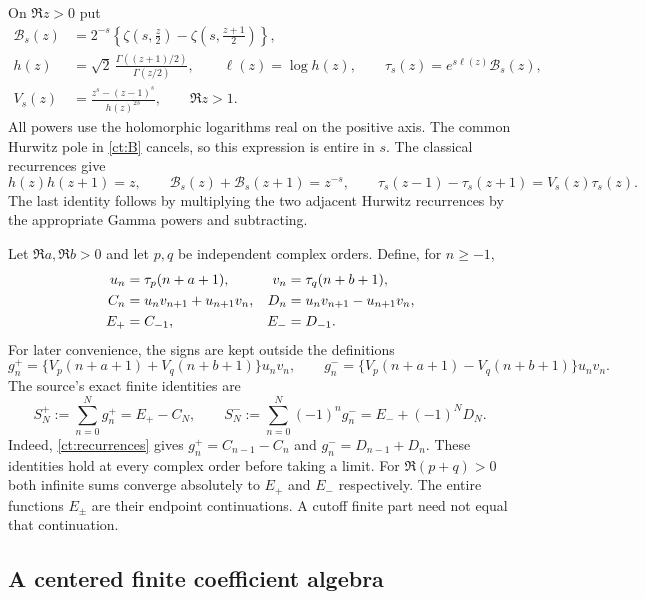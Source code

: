 \documentclass[11pt,letterpaper]{article}
\numberwithin{equation}{section}
\theoremstyle{definition}
\theoremstyle{remark}
\begin{document}
On $\Re z>0$ put
\begin{align}
 \mathcal B_s(z)&=2^{-s}\left\{\zeta\left(s,\frac z2\right)
              -\zeta\left(s,\frac{z+1}{2}\right)\right\},
                   \label{ct:B}\\
 h(z)&=\sqrt2\,\frac{\Gamma((z+1)/2)}{\Gamma(z/2)},
 \qquad \ell(z)=\log h(z),\qquad
 \tau_s(z)=e^{s\ell(z)}\mathcal B_s(z),\label{ct:tau}\\
 V_s(z)&=\frac{z^s-(z-1)^s}{h(z)^{2s}},\qquad \Re z>1.
                   \label{ct:V}
\end{align}
All powers use the holomorphic logarithms real on the positive axis.
The common Hurwitz pole in \eqref{ct:B} cancels, so this expression is
entire in $s$. The classical recurrences give
\begin{equation}\label{ct:recurrences}
 h(z)h(z+1)=z,\qquad
 \mathcal B_s(z)+\mathcal B_s(z+1)=z^{-s},\qquad
 \tau_s(z-1)-\tau_s(z+1)=V_s(z)\tau_s(z).
\end{equation}
The last identity follows by multiplying the two adjacent Hurwitz
recurrences by the appropriate Gamma powers and subtracting.

Let $\Re a,\Re b>0$ and let $p,q$ be independent complex orders. Define,
for $n\ge-1$,
\begin{align}
 u_n&=\tau_p(n+a+1),&v_n&=\tau_q(n+b+1),\notag\\
 C_n&=u_nv_{n+1}+u_{n+1}v_n,&
 D_n&=u_nv_{n+1}-u_{n+1}v_n,\label{ct:CD}\\
 E_+&=C_{-1},&E_-&=D_{-1}.\notag
\end{align}
For later convenience, the signs are kept outside the definitions
\[
 g_n^+=\{V_p(n+a+1)+V_q(n+b+1)\}u_nv_n,
 \qquad
 g_n^-=\{V_p(n+a+1)-V_q(n+b+1)\}u_nv_n.
\]
The source's exact finite identities are
\begin{equation}\label{ct:finite}
 S_N^+:=\sum_{n=0}^N g_n^+=E_+-C_N,
 \qquad
 S_N^-:=\sum_{n=0}^N(-1)^ng_n^-=E_-+(-1)^ND_N.
\end{equation}
Indeed, \eqref{ct:recurrences} gives
$g_n^+=C_{n-1}-C_n$ and $g_n^-=D_{n-1}+D_n$.
These identities hold at every complex order before taking a limit.
For $\Re(p+q)>0$ both infinite sums converge absolutely to $E_+$ and
$E_-$ respectively. The entire functions $E_\pm$ are their endpoint
continuations. A cutoff finite part need not equal that continuation.

\subsection{A centered finite coefficient algebra}
\end{document}
